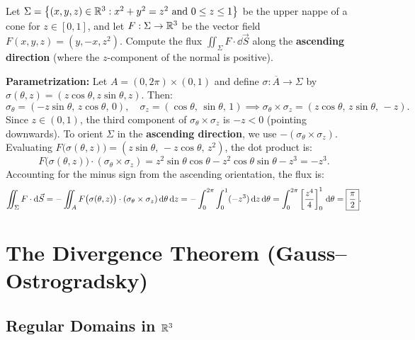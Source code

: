 \begin{exemple}
Let $\Sigma = \left\{(x,y,z) \in \mathbb{R}^3 : x^2 + y^2 = z^2 \text{ and } 0 \le z \le 1\right\}$ be the upper nappe of a cone for $z \in [0,1]$, and let $F : \Sigma \to \mathbb{R}^3$ be the vector field $F(x,y,z) = (y, -x, z^2)$. Compute the flux $\displaystyle\iint_{\Sigma} F \cdot \dd\vec{S}$ along the \textbf{ascending direction} (where the $z$-component of the normal is positive).

\smallskip
\noindent\textbf{Parametrization:} Let $A = (0, 2\pi) \times (0, 1)$ and define $\sigma : \overline{A} \to \Sigma$ by $\sigma(\theta, z) = (z \cos\theta, z \sin\theta, z)$. Then:
\[
    \sigma_\theta = (-z \sin\theta, \, z \cos\theta, \, 0), \quad
    \sigma_z = (\cos\theta, \, \sin\theta, \, 1)
    \implies \sigma_\theta \times \sigma_z = (z \cos\theta, \, z \sin\theta, \, -z).
\]
Since $z \in (0, 1)$, the third component of $\sigma_\theta \times \sigma_z$ is $-z < 0$ (pointing downwards). To orient $\Sigma$ in the \textbf{ascending direction}, we use $-(\sigma_\theta \times \sigma_z)$. Evaluating $F\big(\sigma(\theta, z)\big) = (z \sin\theta, \, -z \cos\theta, \, z^2)$, the dot product is:
\[
    F\big(\sigma(\theta, z)\big) \cdot (\sigma_\theta \times \sigma_z) = z^2 \sin\theta \cos\theta - z^2 \cos\theta \sin\theta - z^3 = -z^3.
\]
Accounting for the minus sign from the ascending orientation, the flux is:
\[
    \iint_{\Sigma} F \cdot \mathrm{d}\vec{S} = - \iint_{A} F\big(\sigma(\theta, z)\big) \cdot (\sigma_\theta \times \sigma_z) \,\mathrm{d}\theta \,\mathrm{d}z = - \int_{0}^{2\pi} \int_{0}^{1} (-z^3) \,\mathrm{d}z \,\mathrm{d}\theta = \int_{0}^{2\pi} \left[ \frac{z^4}{4} \right]_{0}^{1} \,\mathrm{d}\theta = \boxed{\frac{\pi}{2}}.
\]
\end{exemple}

\section{The Divergence Theorem (Gauss--Ostrogradsky)}

\subsection{Regular Domains in $\mathbb{R}^3$}


